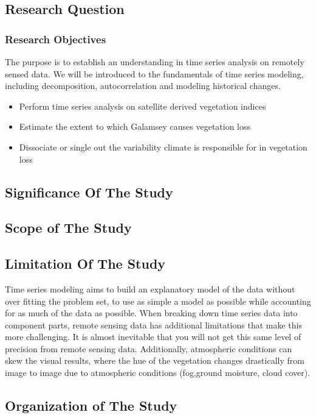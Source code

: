 \documentclass[12pt,a4paper]{article}
\begin{document}
\begin{flushleft}
		  \subsection{Research  Question}
		  \subsubsection{Research Objectives}
		  The purpose is to establish an understanding in time series analysis on remotely sensed data. We will be introduced to the fundamentals of time series modeling, including decomposition, autocorrelation and modeling historical changes.
		  \begin{itemize}
		  	\item  Perform time series analysis on satellite derived vegetation indices
		  	
		  	\item  Estimate the extent to which Galamsey causes vegetation loss
		  	
		  	\item  Dissociate or single out the variability climate is responsible for in vegetation loss
		  \end{itemize}
		  \subsection{Significance Of The  Study}
		  \subsection{Scope of The  Study}
		  \subsection{Limitation Of  The Study }
		  Time series modeling aims to build an explanatory model of the data without over fitting the problem set, to use as simple a model as possible while accounting for as much of the data as possible. When breaking down time series data into component parts, remote sensing data has additional limitations that make this more challenging. It is almost inevitable that you will not get this same level of precision from remote sensing data. Additionally, atmospheric conditions can skew the visual results, where the hue of the vegetation changes drastically from image to image due to atmospheric conditions (fog,ground moisture, cloud cover).
		  \subsection{ Organization  of  The  Study}

\end{flushleft}
\end{document}

